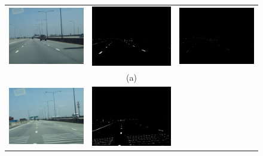 \begin{figure}
  \begin{tabular}{c c c}
    \includegraphics[width=55mm]{figures/original1.jpg} &
    \includegraphics[width=55mm]{figures/convolution1.png} &
    \includegraphics[width=55mm]{figures/localmaxima1.png} \\
    &(a)&\\
    \includegraphics[width=55mm]{figures/original3.jpg} &
    \includegraphics[width=55mm]{figures/convolution3.png} &

\end{tabular}
\end{figure}
